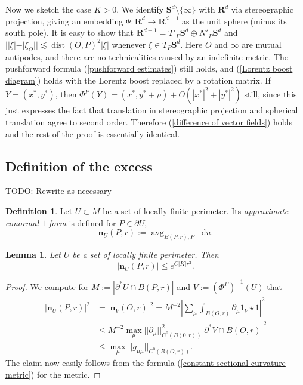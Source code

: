 \documentclass[reqno,10pt]{amsart}
\newcommand{\RR}{\mathbf{R}}
\newcommand{\Sph}{\mathbf S}
\DeclareMathOperator{\avg}{avg}
\newcommand*\dif{\mathop{}\!\mathrm{d}}
\DeclareMathOperator{\dist}{dist}
\newcommand{\normal}{\mathbf n}
\newcommand{\dfn}[1]{\emph{#1}\index{#1}}
\newtheorem{lemma}[theorem]{Lemma}
\theoremstyle{definition}
\newtheorem{definition}[theorem]{Definition}
\numberwithin{equation}{section}
\begin{document}
Now we sketch the case $K > 0$.
We identify $\Sph^d \setminus \{\infty\}$ with $\RR^d$ via stereographic projection, giving an embedding $\Psi: \RR^d \to \RR^{d + 1}$ as the unit sphere (minus its south pole).
It is easy to show that $\RR^{d + 1} = T'_P \Sph^d \oplus N'_P \Sph^d$ and $||\xi| - |\xi_O|| \lesssim \dist(O, P)^2 |\xi|$ whenever $\xi \in T_P \Sph^d$.
Here $O$ and $\infty$ are mutual antipodes, and there are no technicalities caused by an indefinite metric.
The pushforward formula (\ref{pushforward estimates}) still holds, and (\ref{Lorentz boost diagram}) holds with the Lorentz boost replaced by a rotation matrix.
If $Y = (x^*, y^*)$, then $\Phi^P(Y) = (x^*, y^* + \rho) + O(|x^*|^2 + |y^*|^2)$ still, since this just expresses the fact that translation in stereographic projection and spherical translation agree to second order.
Therefore (\ref{difference of vector fields}) holds and the rest of the proof is essentially identical.

\subsection{Definition of the excess}
TODO: Rewrite as necessary

\begin{definition}
Let $U \subset M$ be a set of locally finite perimeter. Its \dfn{approximate conormal $1$-form} is defined for $P \in \partial U$,
$$\normal_U(P, r) := \avg_{B(P, r), P} \dif u.$$
\end{definition}

\begin{lemma}\label{gauge invariance of the normal}
Let $U$ be a set of locally finite perimeter. Then
$$|\normal_U(P, r)| \leq e^{C|K|r^2}.$$
\end{lemma}
\begin{proof}
We compute for $M := |\partial^* U \cap B(P, r)|$ and $V := (\Phi^P)^{-1}(U)$ that
\begin{align*}
|\normal_U(P, r)|^2 &= |\normal_V(O, r)|^2 = M^{-2} \left|\sum_\mu \int_{B(O, r)} \partial_\mu 1_V \star 1\right|^2 \\
&\leq M^{-2} \max_\mu ||\partial_\mu||_{C^0(B(0, r))}^2 |\partial^* V \cap B(O, r)|^2 \\
&\leq \max_\mu ||g_{\mu\mu}||_{C^0(B(O, r))}.
\end{align*}
The claim now easily follows from the formula (\ref{constant sectional curvature metric}) for the metric.
\end{proof}
\end{document}
